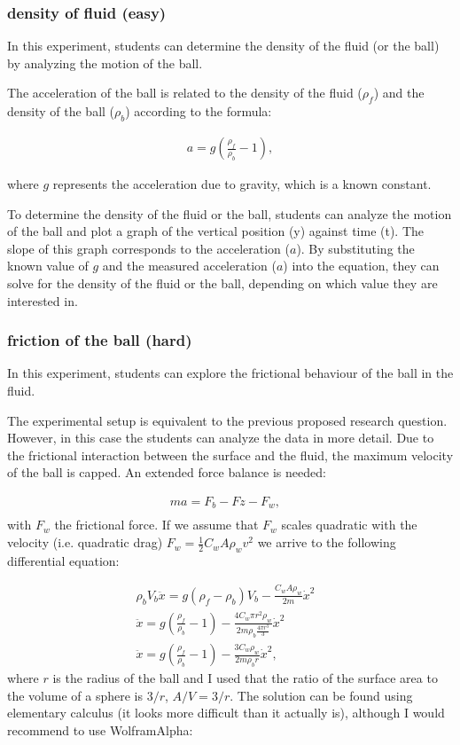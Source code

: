 \documentclass{article}
\begin{document}
\subsubsection{density of fluid (easy)}
In this experiment, students can determine the density of the fluid (or the ball) by analyzing the motion of the ball.

The acceleration of the ball is related to the density of the fluid ($\rho_f$) and the density of the ball ($\rho_b$) according to the formula:

\begin{align}
a = g \left(\frac{\rho_f}{\rho_b} - 1\right),
\end{align}

where $g$ represents the acceleration due to gravity, which is a known constant.

To determine the density of the fluid or the ball, students can analyze the motion of the ball and plot a graph of the vertical position (y) against time (t). The slope of this graph corresponds to the acceleration ($a$). By substituting the known value of $g$ and the measured acceleration ($a$) into the equation, they can solve for the density of the fluid or the ball, depending on which value they are interested in.

\subsubsection{friction of the ball (hard)}
In this experiment, students can explore the frictional behaviour of the ball in the fluid.

The experimental setup is equivalent to the previous proposed research question. However, in this case the students can analyze the data in more detail. Due to the frictional interaction between the surface and the fluid, the maximum velocity of the ball is capped. An extended force balance is needed:

\begin{align}
    ma = F_b - Fz - F_w,& \\
\end{align}
with $F_w$ the frictional force. If we assume that $F_w$ scales quadratic with the velocity (i.e. quadratic drag) $F_w = \frac{1}{2}C_w A \rho_w v^2$ we arrive to the following differential equation:

\begin{align}
    \rho_b V_b \ddot{x} = g\left(\rho_f-\rho_b\right)V_b -\frac{C_w A \rho_w}{2m} \dot{x}^2 & \\
    \ddot{x} = g \left(\frac{\rho_f}{\rho_b} - 1\right) - \frac{4C_w \pi r^2 \rho_w}{2m\rho_b \frac{4\pi r^3}{3}} \dot{x}^2 & \\
    \ddot{x} = g \left(\frac{\rho_f}{\rho_b} - 1\right) - \frac{3C_w \rho_w}{2m\rho_b r} \dot{x}^2,
\end{align}
where $r$ is the radius of the ball and I used that the ratio of the surface area to the volume of a sphere is $3/r$, $A/V = 3/r$. The solution can be found using elementary calculus (it looks more difficult than it actually is), although I would recommend to use WolframAlpha:
\end{document}
